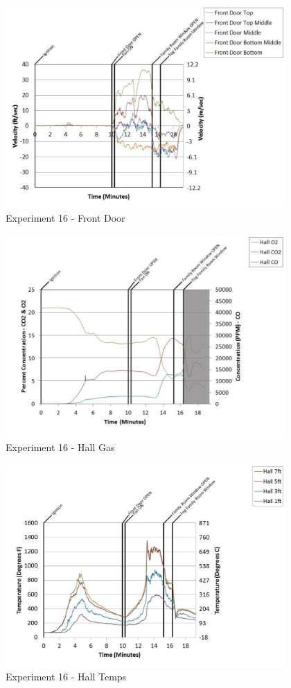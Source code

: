 \documentclass{article}
\begin{document}
\begin{appendices}
	\begin{figure}[h!]
		\centering
		\includegraphics[height=3.05in]{0_Images/Results_Charts/Exp_16_Charts/FrontDoor.pdf}
		\caption{Experiment 16 - Front Door}
	\end{figure}
 
	\clearpage

	\begin{figure}[h!]
		\centering
		\includegraphics[height=3.05in]{0_Images/Results_Charts/Exp_16_Charts/HallGas.pdf}
		\caption{Experiment 16 - Hall Gas}
	\end{figure}
 

	\begin{figure}[h!]
		\centering
		\includegraphics[height=3.05in]{0_Images/Results_Charts/Exp_16_Charts/HallTemps.pdf}
		\caption{Experiment 16 - Hall Temps}
	\end{figure}
 

\end{appendices}
\end{document}
